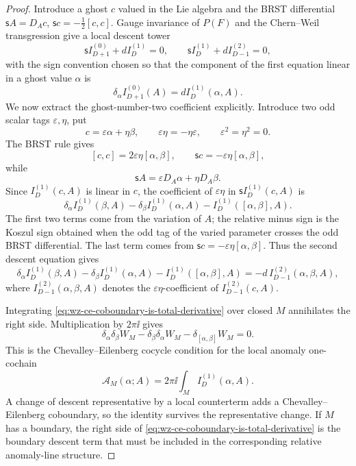 \begin{proof}
Introduce a ghost \(c\) valued in the Lie algebra and the BRST differential
\(\mathsf s A=D_Ac\), \(\mathsf sc=-\frac12[c,c]\).  Gauge invariance of
\(P(F)\) and the Chern--Weil transgression give a local descent tower
\[
  \mathsf s I_{D+1}^{(0)}+dI_D^{(1)}=0,
  \qquad
  \mathsf s I_D^{(1)}+dI_{D-1}^{(2)}=0,
\]
with the sign convention chosen so that the component of the first equation
linear in a ghost value \(\alpha\) is
\[
  \delta_\alpha I_{D+1}^{(0)}(A)=dI_D^{(1)}(\alpha,A).
\]
We now extract the ghost-number-two coefficient explicitly.  Introduce two
odd scalar tags \(\varepsilon,\eta\), put
\[
  c=\varepsilon\alpha+\eta\beta,
  \qquad
  \varepsilon\eta=-\eta\varepsilon,\qquad
  \varepsilon^2=\eta^2=0.
\]
The BRST rule gives
\[
  [c,c]=2\varepsilon\eta[\alpha,\beta],
  \qquad
  \mathsf sc=-\varepsilon\eta[\alpha,\beta],
\]
while
\[
  \mathsf sA
  =
  \varepsilon D_A\alpha+\eta D_A\beta .
\]
Since \(I_D^{(1)}(c,A)\) is linear in \(c\), the coefficient of
\(\varepsilon\eta\) in \(\mathsf s I_D^{(1)}(c,A)\) is
\begin{equation}
  \delta_\alpha I_D^{(1)}(\beta,A)
  -
  \delta_\beta I_D^{(1)}(\alpha,A)
  -
  I_D^{(1)}([\alpha,\beta],A).
  \label{eq:wz-ce-cochain-from-ghost-two}
\end{equation}
The first two terms come from the variation of \(A\); the relative minus sign
is the Koszul sign obtained when the odd tag of the varied parameter crosses
the odd BRST differential.  The last term comes from
\(\mathsf sc=-\varepsilon\eta[\alpha,\beta]\).  Thus the second descent
equation gives
\begin{equation}
  \delta_\alpha I_D^{(1)}(\beta,A)
  -
  \delta_\beta I_D^{(1)}(\alpha,A)
  -
  I_D^{(1)}([\alpha,\beta],A)
  =
  -d\,I_{D-1}^{(2)}(\alpha,\beta,A),
  \label{eq:wz-ce-coboundary-is-total-derivative}
\end{equation}
where \(I_{D-1}^{(2)}(\alpha,\beta,A)\) denotes the
\(\varepsilon\eta\)-coefficient of \(I_{D-1}^{(2)}(c,A)\).

Integrating \eqref{eq:wz-ce-coboundary-is-total-derivative} over closed \(M\)
annihilates the right side.  Multiplication by \(2\pi\ii\) gives
\[
  \delta_\alpha\delta_\beta W_M
  -
  \delta_\beta\delta_\alpha W_M
  -
  \delta_{[\alpha,\beta]}W_M
  =
  0.
\]
This is the Chevalley--Eilenberg cocycle condition for the local anomaly
one-cochain
\[
  \mathcal A_M(\alpha;A)
  =
  2\pi\ii\int_M I_D^{(1)}(\alpha,A).
\]
A change of descent representative by a local counterterm adds a
Chevalley--Eilenberg coboundary, so the identity survives the representative
change.  If \(M\) has a boundary, the right side of
\eqref{eq:wz-ce-coboundary-is-total-derivative} is the boundary descent term
that must be included in the corresponding relative anomaly-line structure.
\end{proof}

